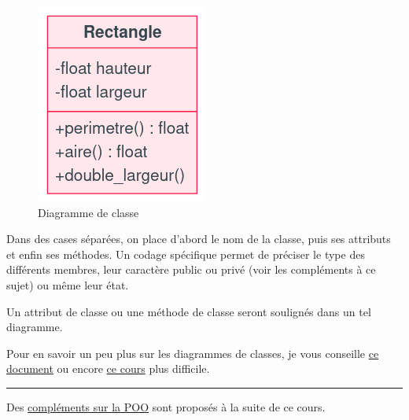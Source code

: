 \documentclass[
  letterpaper,
  DIV=11,
  numbers=noendperiod]{scrartcl}
\begin{document}
\begin{figure}

{\centering \includegraphics{classe_mermaid.png}

}

\caption{Diagramme de classe}

\end{figure}

Dans des cases séparées, on place d'abord le nom de la classe, puis ses
attributs et enfin ses méthodes. Un codage spécifique permet de préciser
le type des différents membres, leur caractère public ou privé (voir les
compléments à ce sujet) ou même leur état.

Un attribut de classe ou une méthode de classe seront soulignés dans un
tel diagramme.

Pour en savoir un peu plus sur les diagrammes de classes, je vous
conseille
\href{https://inf1410.teluq.ca/teluqDownload.php?file=2014/01/INF1410_Guide_UML_DCC.pdf}{ce
document} ou encore
\href{https://laurent-audibert.developpez.com/Cours-UML/?page=diagramme-classes}{ce
cours} plus difficile.

\begin{center}\rule{0.5\linewidth}{0.5pt}\end{center}

Des \href{POO_complements.md}{compléments sur la POO} sont proposés à la
suite de ce cours.
\end{document}
